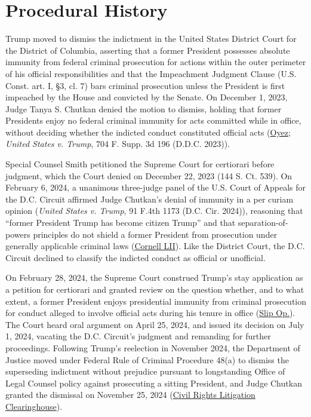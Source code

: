 \documentclass[12pt]{article}
\begin{document}
\section{Procedural History}

Trump moved to dismiss the indictment in the United States District Court for the District of Columbia, asserting that a former President possesses absolute immunity from federal criminal prosecution for actions within the outer perimeter of his official responsibilities and that the Impeachment Judgment Clause (U.S. Const. art. I, \S 3, cl. 7) bars criminal prosecution unless the President is first impeached by the House and convicted by the Senate. On December 1, 2023, Judge Tanya S. Chutkan denied the motion to dismiss, holding that former Presidents enjoy no federal criminal immunity for acts committed while in office, without deciding whether the indicted conduct constituted official acts (\href{https://www.oyez.org/cases/2023/23-939}{Oyez}; \textit{United States v. Trump}, 704 F. Supp. 3d 196 (D.D.C. 2023)).

Special Counsel Smith petitioned the Supreme Court for certiorari before judgment, which the Court denied on December 22, 2023 (144 S. Ct. 539). On February 6, 2024, a unanimous three-judge panel of the U.S. Court of Appeals for the D.C. Circuit affirmed Judge Chutkan's denial of immunity in a per curiam opinion (\textit{United States v. Trump}, 91 F.4th 1173 (D.C. Cir. 2024)), reasoning that ``former President Trump has become citizen Trump'' and that separation-of-powers principles do not shield a former President from prosecution under generally applicable criminal laws (\href{https://www.law.cornell.edu/supremecourt/text/23-939}{Cornell LII}). Like the District Court, the D.C. Circuit declined to classify the indicted conduct as official or unofficial.

On February 28, 2024, the Supreme Court construed Trump's stay application as a petition for certiorari and granted review on the question whether, and to what extent, a former President enjoys presidential immunity from criminal prosecution for conduct alleged to involve official acts during his tenure in office (\href{https://www.supremecourt.gov/opinions/23pdf/23-939_e2pg.pdf}{Slip Op.}). The Court heard oral argument on April 25, 2024, and issued its decision on July 1, 2024, vacating the D.C. Circuit's judgment and remanding for further proceedings. Following Trump's reelection in November 2024, the Department of Justice moved under Federal Rule of Criminal Procedure 48(a) to dismiss the superseding indictment without prejudice pursuant to longstanding Office of Legal Counsel policy against prosecuting a sitting President, and Judge Chutkan granted the dismissal on November 25, 2024 (\href{https://clearinghouse.net/case/46788/}{Civil Rights Litigation Clearinghouse}).
\end{document}
